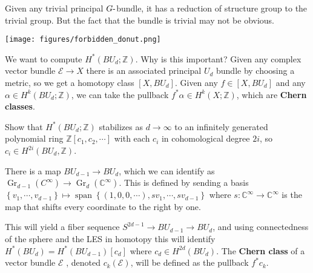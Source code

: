 \begin{example}[?]

Given any trivial principal \(G{\hbox{-}}\)bundle, it has a reduction of
structure group to the trivial group. But the fact that the bundle is
trivial may not be obvious.

\texttt{[image: figures/forbidden\_donut.png]}

\end{example}

\begin{remark}

We want to compute \(H^*(BU_d; {\mathbb{Z}})\). Why is this important?
Given any complex vector bundle \(\mathcal{E}\to X\) there is an
associated principal \(U_d\) bundle by choosing a metric, so we get a
homotopy class \([X, BU_d]\). Given any \(f\in [X, BU_d]\) and any
\(\alpha\in H^k(BU_d; {\mathbb{Z}})\), we can take the pullback
\(f^* \alpha \in H^k(X; {\mathbb{Z}})\), which are \textbf{Chern
classes}.

\end{remark}

\begin{exercise}[?]

Show that \(H^*(BU_d; {\mathbb{Z}})\) stabilizes as \(d\to \infty\) to
an infinitely generated polynomial ring
\({\mathbb{Z}}[c_1, c_2, \cdots]\) with each \(c_i\) in cohomological
degree \(2i\), so \(c_i \in H^{2i}(BU_d, {\mathbb{Z}})\).

\end{exercise}

\begin{definition}[?]

There is a map \(BU_{d-1} \to BU_d\), which we can identify as
\({\operatorname{Gr}}_{d-1}(C^{\infty }) \to {\operatorname{Gr}}_d({\mathbb{C}}^{\infty })\).
This is defined by sending a basis
\(\left\{{v_1, \cdots, v_{d-1}}\right\} \mapsto {\operatorname{span}}\left\{{ (1, 0, 0, \cdots), sv_1, \cdots, sv_{d-1} }\right\}\)
where \(s: {\mathbb{C}}^{\infty } \to {\mathbb{C}}^{\infty}\) is the map
that shifts every coordinate to the right by one.


This will yield a fiber sequence \(S^{2d-1} \to BU_{d-1} \to BU_d\), and
using connectedness of the sphere and the LES in homotopy this will
identify \(H^*(BU_d) = H^*(BU_{d-1})[c_d]\) where
\(c_d \in H^{2d}(BU_d)\). The \textbf{Chern class} of a vector bundle
\(\mathcal{E}\) , denoted \(c_k( \mathcal{E} )\), will be defined as the
pullback \(f^* c_k\).

\end{definition}

